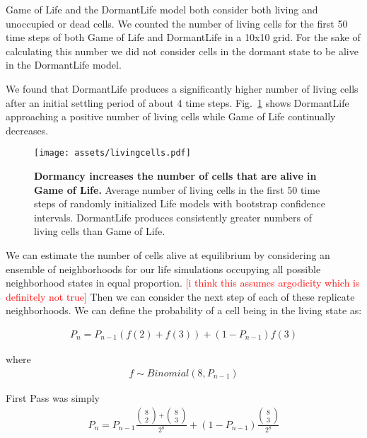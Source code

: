 \documentclass[12pt]{article}
\newcommand{\figref}[1]{Fig.~\ref{fig:#1}}
\newcommand{\note}[1]{\textcolor{red}{[#1]}}
\begin{document}
Game of Life and the DormantLife model both consider both living and unoccupied
or dead cells. We counted the number of living cells for the first 50 time
steps of both Game of Life and DormantLife in a 10x10 grid. For the sake of
calculating this number we did not consider cells in the dormant state to be
alive in the DormantLife model.

We found that DormantLife produces a significantly higher number of living cells
after an initial settling period of about 4 time steps. \figref{living-cells}
shows DormantLife approaching a positive number of living cells while Game of
Life continually decreases.

\begin{figure}
    \centering
    \texttt{[image: assets/livingcells.pdf]}
    \caption{\textbf{Dormancy increases the number of cells that are alive in
    Game of Life.} Average number of living cells in the first 50 time steps of
    randomly initialized Life models with bootstrap confidence intervals.
    DormantLife produces consistently greater numbers of living cells than
    Game of Life.}
    \label{fig:living-cells}
\end{figure}

We can estimate the number of cells alive at equilibrium by considering an
ensemble of neighborhoods for our life simulations occupying all possible
neighborhood states in equal proportion. \note{i think this assumes argodicity
which is definitely not true} Then we can consider the next step of each of
these replicate neighborhoods. We can define the probability of a cell being
in the living state as:

\begin{align}
    P_n = P_{n-1}(f(2) + f(3)) + (1-P_{n-1})f(3)
\end{align}

where
\begin{align*}
    f \sim Binomial(8, P_{n-1})
\end{align*}

First Pass was simply
\begin{align}
    P_n = P_{n-1}\frac{ \left(\begin{matrix}8\\2\end{matrix} \right)
    + \left (\begin{matrix} 8 \\ 3 \end{matrix} \right)}{2^8} + 
    (1-P_{n-1}) \frac{\left (\begin{matrix} 8 \\ 3 \end{matrix} \right)}{2^8}
\end{align}
\end{document}
